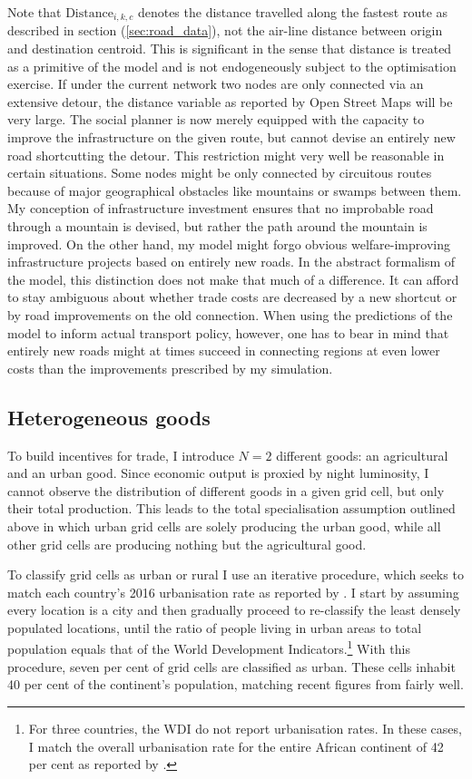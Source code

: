 \documentclass[11pt, oneside]{article}   	%
\let\oldref\ref
\renewcommand{\ref}[1]{(\oldref{#1})}
\begin{document}
Note that $\textrm{Distance}_{i,k,c}$ denotes the distance travelled along the fastest route as described in section \ref{sec:road_data}, not the air-line distance between origin and destination centroid. This is significant in the sense that distance is treated as a primitive of the model and is not endogeneously subject to the optimisation exercise. If under the current network two nodes are only connected via an extensive detour, the distance variable as reported by Open Street Maps will be very large. The social planner is now merely equipped with the capacity to improve the infrastructure on the given route, but cannot devise an entirely new road shortcutting the detour. This restriction might very well be reasonable in certain situations. Some nodes might be only connected by circuitous routes because of major geographical obstacles like mountains or swamps between them. My conception of infrastructure investment ensures that no improbable road through a mountain is devised, but rather the path around the mountain is improved. On the other hand, my model might forgo obvious welfare-improving infrastructure projects based on entirely new roads. In the abstract formalism of the model, this distinction does not make that much of a difference. It can afford to stay ambiguous about whether trade costs are decreased by a new shortcut or by road improvements on the old connection. When using the predictions of the model to  inform actual transport policy, however, one has to bear in mind that entirely new roads might at times succeed in connecting regions at even lower costs than the improvements prescribed by my simulation.

\subsection{Heterogeneous goods}
To build incentives for trade, I introduce $N=2$ different goods: an agricultural and an urban good. Since economic output is proxied by night luminosity, I cannot observe the distribution of different goods in a given grid cell, but only their total production. This leads to the total specialisation assumption outlined above in which urban grid cells are solely producing the urban good, while all other grid cells are producing nothing but the agricultural good.

To classify grid cells as urban or rural I use an iterative procedure, which seeks to match each country's 2016 urbanisation rate as reported by \cite{the_world_bank_world_2017}. I start by assuming every location is a city and then gradually proceed to re-classify the least densely populated locations, until the ratio of people living in urban areas to total population equals that of the World Development Indicators.\footnote{For three countries, the WDI do not report urbanisation rates. In these cases, I match the overall urbanisation rate for the entire African continent of 42 per cent as reported by \cite{lall_africas_2017}.} With this procedure, seven per cent of grid cells are classified as urban. These cells inhabit 40 per cent of the continent's population, matching recent figures from \cite{lall_africas_2017} fairly well.
\end{document}
